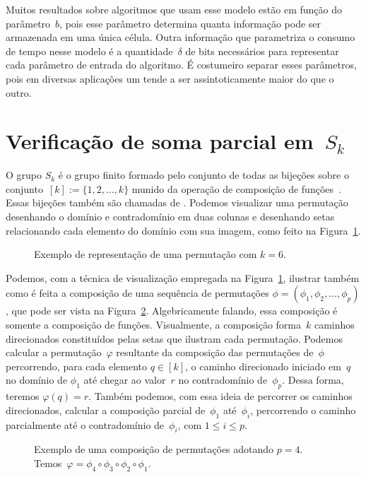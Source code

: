 Muitos resultados sobre algoritmos que usam esse modelo estão em função do parâmetro~$b$, pois esse parâmetro determina quanta informação pode ser armazenada em uma única célula. Outra informação que parametriza o consumo de tempo nesse modelo é a quantidade~$\delta$ de bits necessários para representar cada parâmetro de entrada do algoritmo. É costumeiro separar esses parâmetros, pois em diversas aplicações um tende a ser assintoticamente maior do que o outro.

\section{Verificação de soma parcial em~$S_k$}
\label{sec:lim-verificacao-Sk}

O grupo $S_k$ é o grupo finito formado pelo conjunto de todas as bijeções sobre o conjunto~${[k]:=\{1,2,\ldots,k\}}$ munido da operação de composição de funções~\cite{agozine2010}. Essas bijeções também são chamadas de . Podemos visualizar uma permutação desenhando o domínio e contradomínio em duas colunas e desenhando setas relacionando cada elemento do domínio com sua imagem, como feito na Figura~\ref{fig:LIM-exemplo-uma-perm}.

\begin{figure}[htb]
\centering

\caption{Exemplo de representação de uma permutação com $k=6$.}
\label{fig:LIM-exemplo-uma-perm}
\end{figure}

Podemos, com a técnica de visualização empregada na Figura~\ref{fig:LIM-exemplo-uma-perm}, ilustrar também como é feita a composição de uma sequência de permutações ${\phi=(\phi_1, \phi_2, \ldots, \phi_p)}$, que pode ser vista na Figura~\ref{fig:LIM-exemplo-comp}. Algebricamente falando, essa composição é somente a composição de funções. Visualmente, a composição forma~$k$ caminhos direcionados constituídos pelas setas que ilustram cada permutação. Podemos calcular a permutação~$\varphi$ resultante da composição das permutações de~$\phi$ percorrendo, para cada elemento $q\in [k]$, o caminho direcionado iniciado em~$q$ no domínio de $\phi_1$ até chegar ao valor~$r$ no contradomínio de~$\phi_p$. Dessa forma, teremos $\varphi(q)=r$. Também podemos, com essa ideia de percorrer os caminhos direcionados, calcular a composição parcial de~$\phi_1$ até~$\phi_i$, percorrendo o caminho parcialmente até o contradomínio de~$\phi_i$, com $1\leqslant i \leqslant p$.

\begin{figure}[htb]
\centering

\caption{Exemplo de uma composição de permutações adotando $p=4$. Temos~$\varphi = \phi_4\circ \phi_3\circ \phi_2\circ \phi_1$.}
\label{fig:LIM-exemplo-comp}
\end{figure}

